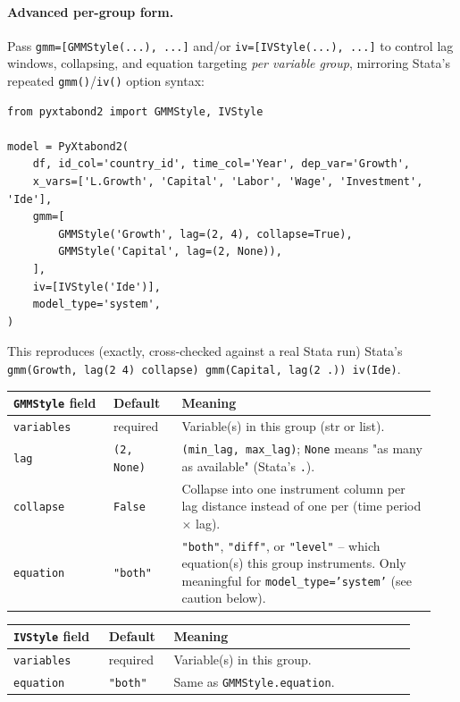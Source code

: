 \documentclass[11pt,a4paper]{article}
\begin{document}
\paragraph{Advanced per-group form.} Pass \texttt{gmm=[GMMStyle(...), ...]}
and/or \texttt{iv=[IVStyle(...), ...]} to control lag windows, collapsing,
and equation targeting \emph{per variable group}, mirroring Stata's repeated
\texttt{gmm()}/\texttt{iv()} option syntax:

\begin{lstlisting}[style=pystyle]
from pyxtabond2 import GMMStyle, IVStyle

model = PyXtabond2(
    df, id_col='country_id', time_col='Year', dep_var='Growth',
    x_vars=['L.Growth', 'Capital', 'Labor', 'Wage', 'Investment', 'Ide'],
    gmm=[
        GMMStyle('Growth', lag=(2, 4), collapse=True),
        GMMStyle('Capital', lag=(2, None)),
    ],
    iv=[IVStyle('Ide')],
    model_type='system',
)
\end{lstlisting}

This reproduces (exactly, cross-checked against a real Stata run) Stata's
\texttt{gmm(Growth, lag(2 4) collapse) gmm(Capital, lag(2 .)) iv(Ide)}.

\begin{longtable}{@{}p{0.22\linewidth}p{0.15\linewidth}p{0.57\linewidth}@{}}
\toprule
\textbf{\texttt{GMMStyle} field} & \textbf{Default} & \textbf{Meaning} \\
\midrule
\endhead
\texttt{variables} & required & Variable(s) in this group (str or list). \\
\texttt{lag} & \texttt{(2, None)} & \texttt{(min\_lag, max\_lag)};
  \texttt{None} means "as many as available" (Stata's \texttt{.}). \\
\texttt{collapse} & \texttt{False} & Collapse into one instrument column per
  lag distance instead of one per (time period $\times$ lag). \\
\texttt{equation} & \texttt{"both"} & \texttt{"both"}, \texttt{"diff"}, or
  \texttt{"level"} -- which equation(s) this group instruments. Only
  meaningful for \texttt{model\_type='system'} (see caution below). \\
\bottomrule
\end{longtable}

\begin{longtable}{@{}p{0.22\linewidth}p{0.15\linewidth}p{0.57\linewidth}@{}}
\toprule
\textbf{\texttt{IVStyle} field} & \textbf{Default} & \textbf{Meaning} \\
\midrule
\endhead
\texttt{variables} & required & Variable(s) in this group. \\
\texttt{equation} & \texttt{"both"} & Same as \texttt{GMMStyle.equation}. \\
\bottomrule
\end{longtable}
\end{document}
